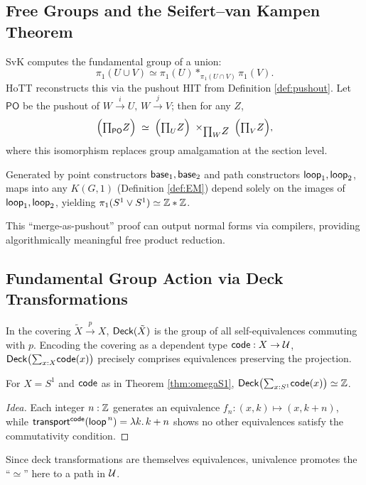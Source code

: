 \subsection{Free Groups and the Seifert–van Kampen Theorem}\label{sec:vankampen}
SvK computes the fundamental group of a union:
\[
  \pi_1(U\cup V)\simeq
  \pi_1(U)*_{\pi_1(U\cap V)}\pi_1(V).
\]
HoTT reconstructs this via the pushout HIT from Definition \ref{def:pushout}.
Let
\(\mathsf{PO}\) be the pushout of
\(W\xrightarrow{i}U,\,W\xrightarrow{j}V\);
then for any \(Z\),
\[
  \Bigl(\textstyle\mathbf{\prod}_{\mathsf{PO}} Z\Bigr)\;\simeq\;
  \Bigl(\textstyle\mathbf{\prod}_U Z\Bigr)\;\times_{\textstyle\mathbf{\prod}_W Z}\;
  \Bigl(\textstyle\mathbf{\prod}_V Z\Bigr),
\]
where this isomorphism replaces group amalgamation at the section level.

\begin{example}[\(S^1\vee S^1\)]
  Generated by point constructors \(\textsf{base}_1,\textsf{base}_2\) and path constructors
  \(\textsf{loop}_1,\textsf{loop}_2\),
  maps into any \(K(G,1)\) (Definition \ref{def:EM}) depend solely on the images of
  \(\textsf{loop}_1,\textsf{loop}_2\), yielding
  \(\pi_1(S^1\vee S^1)\simeq\mathbb{Z}*\mathbb{Z}\).
\end{example}

This ``merge-as-pushout'' proof can output normal forms via compilers, providing algorithmically meaningful free product reduction.

\subsection{Fundamental Group Action via Deck Transformations}\label{sec:deck}
In the covering \(\tilde X\xrightarrow{p}X\),
\(\textsf{Deck}(\tilde X)\) is the group of all self-equivalences commuting with \(p\).
Encoding the covering as a dependent type
\(\textsf{code}:X\to\mathcal{U}\),
\(\textsf{Deck}\bigl(\textstyle\mathbf{\sum}_{x:X}\textsf{code}(x)\bigr)\)
precisely comprises equivalences preserving the projection.

\begin{theorem}\label{thm:deckZ}
  For \(X=S^1\) and \(\textsf{code}\) as in Theorem \ref{thm:omegaS1},
  \(\textsf{Deck}\bigl(\textstyle\mathbf{\sum}_{x:S^1}\textsf{code}(x)\bigr)\simeq\mathbb{Z}\).
\end{theorem}

\begin{proof}[Idea]
  Each integer \(n:\mathbb{Z}\) generates an equivalence
  \(f_n:(x,k)\mapsto(x,k+n)\),
  while
  \(\textsf{transport}^{\textsf{code}}(\textsf{loop}^{\,n})=\lambda k.\,k+n\)
  shows no other equivalences satisfy the commutativity condition.
\end{proof}

Since deck transformations are themselves equivalences,
univalence promotes the ``\(\simeq\)'' here to a path in \(\mathcal{U}\).
